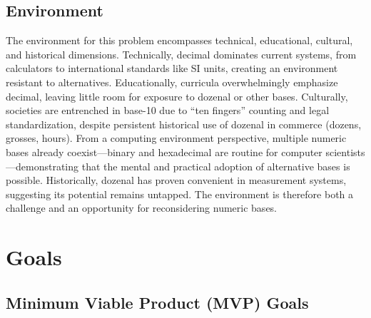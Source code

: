 \documentclass{article}
\begin{document}
    \subsection{Environment}
    The environment for this problem encompasses technical, educational, cultural, and 
    historical dimensions. Technically, decimal dominates current systems, from calculators 
    to international standards like SI units, creating an environment resistant to 
    alternatives. Educationally, curricula overwhelmingly emphasize decimal, leaving little 
    room for exposure to dozenal or other bases. Culturally, societies are entrenched in 
    base-10 due to “ten fingers” counting and legal standardization, despite persistent 
    historical use of dozenal in commerce (dozens, grosses, hours). From a computing 
    environment perspective, multiple numeric bases already coexist—binary and hexadecimal 
    are routine for computer scientists—demonstrating that the mental and practical adoption 
    of alternative bases is possible. Historically, dozenal has proven convenient in 
    measurement systems, suggesting its potential remains untapped. The environment is 
    therefore both a challenge and an opportunity for reconsidering numeric bases.

    \section{Goals}

    \subsection{Minimum Viable Product (MVP) Goals}
\end{document}
